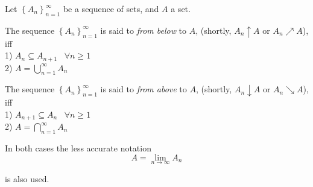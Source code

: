 \documentclass[12pt]{article}
\begin{document}
Let $\left\{ A_{n}\right\} _{n=1}^{\infty }$ be a sequence of sets,
and $A$ a set.

The sequence $\left\{ A_{n}\right\} _{n=1}^{\infty }$ is said to \emph{ from below} to $A$, (shortly, $A_{n}\uparrow A$ or $A_n \nearrow A$), iff \\
1) $A_{n}\subseteq A_{n+1}$ \ $\forall n\geq 1$ \\
2) $\displaystyle A=\bigcup_{n=1}^{\infty }A_{n}$

The sequence $\left\{ A_{n}\right\} _{n=1}^{\infty }$ is said to \emph{ from above} to $A$, (shortly, $A_{n}\downarrow A$ or $A_n \searrow A$), iff \\
1) $A_{n+1}\subseteq A_{n}$ \ $\forall n\geq 1$ \\
2) $\displaystyle A=\bigcap_{n=1}^{\infty }A_{n}$


In both cases the less accurate notation%
\[
A=\lim_{n\longrightarrow \infty }A_{n}
\]

is also used.
\end{document}
